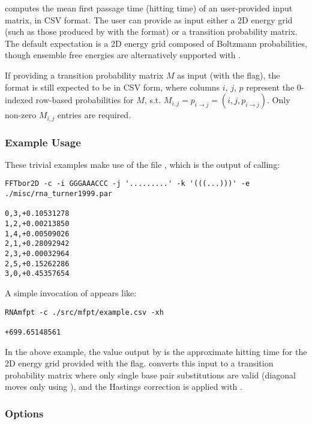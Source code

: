 \documentclass[11pt]{article}
\begin{document}
\rnamfpt computes the mean first passage time (hitting time) of an user-provided input matrix, in CSV format. The user can provide as input either a 2D energy grid (such as those produced by \fft with the  format) or a transition probability matrix. The default expectation is a 2D energy grid composed of Boltzmann probabilities, though ensemble free energies are alternatively supported with .

If providing a transition probability matrix $M$ as input (with the  flag), the format is still expected to be in CSV form, where columns $i$, $j$, $p$ represent the 0-indexed row-based probabilities for $M$, s.t. $M_{i, j} = p_{i\to j} = (i, j,p_{i\to j})$. Only non-zero $M_{i, j}$ entries are required.

\subsubsection{Example Usage} \label{subsub:rnamfptex}

These trivial examples make use of the file , which is the output of calling:

\begin{verbatim}
FFTbor2D -c -i GGGAAACCC -j '.........' -k '(((...)))' -e ./misc/rna_turner1999.par

0,3,+0.10531278
1,2,+0.00213850
1,4,+0.00509026
2,1,+0.28092942
2,3,+0.00032964
2,5,+0.15262286
3,0,+0.45357654
\end{verbatim}

\noindent A simple invocation of \rnamfpt appears like:

\begin{verbatim}
RNAmfpt -c ./src/mfpt/example.csv -xh

+699.65148561
\end{verbatim}

In the above example, the value output by \rnamfpt is the approximate hitting time for the 2D energy grid provided with the  flag. \rnamfpt converts this input to a transition probability matrix where only single base pair substitutions are valid (diagonal moves only using ), and the Hastings correction is applied with .

\subsubsection{Options} \label{subsub:rnamfptopt}
\end{document}
